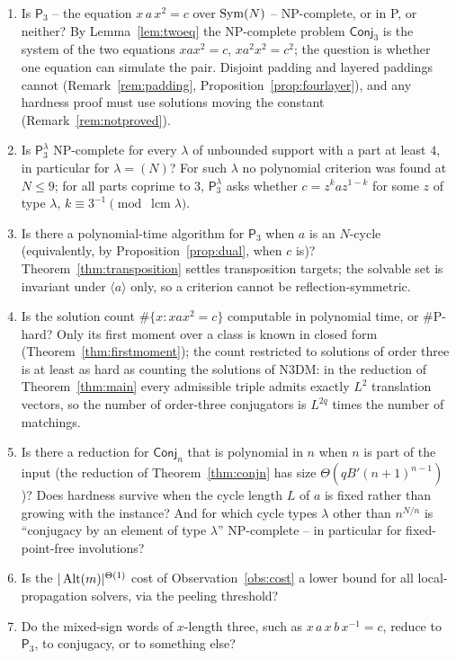 \documentclass[preprint,12pt]{elsarticle}
\theoremstyle{definition}\newtheorem{defi}[thm]{Definition}\newtheorem{prob}[thm]{Problem}\newtheorem{obs}[thm]{Observation}
\theoremstyle{remark}\newtheorem{rem}[thm]{Remark}
\newcommand{\Pthree}{\mathsf{P}_3}\newcommand{\Conj}[1]{\mathsf{Conj}_{#1}}\newcommand{\Dzero}{\Conj{3}}\newcommand{\TR}{T_{\mathcal R}}
\begin{document}
\begin{enumerate}
\item Is $\Pthree$ -- the equation $x\,a\,x^{2}=c$ over $\operatorname{Sym}(N)$ -- NP-complete, or in P, or neither? By Lemma~\ref{lem:twoeq} the NP-complete problem $\Dzero$ is the system of the two equations $xax^{2}=c$, $xa^{2}x^{2}=c^{2}$; the question is whether one equation can simulate the pair. Disjoint padding and layered paddings cannot (Remark~\ref{rem:padding}, Proposition~\ref{prop:fourlayer}), and any hardness proof must use solutions moving the constant (Remark~\ref{rem:notproved}).
\item Is $\Pthree^{\lambda}$ NP-complete for every $\lambda$ of unbounded support with a part at least $4$, in particular for $\lambda=(N)$? For such $\lambda$ no polynomial criterion was found at $N\le9$; for all parts coprime to $3$, $\Pthree^{\lambda}$ asks whether $c=z^{k}az^{1-k}$ for some $z$ of type $\lambda$, $k\equiv3^{-1}\pmod{\operatorname{lcm}\lambda}$.
\item Is there a polynomial-time algorithm for $\Pthree$ when $a$ is an $N$-cycle (equivalently, by Proposition~\ref{prop:dual}, when $c$ is)? Theorem~\ref{thm:transposition} settles transposition targets; the solvable set is invariant under $\langle a\rangle$ only, so a criterion cannot be reflection-symmetric.
\item Is the solution count $\#\{x:xax^{2}=c\}$ computable in polynomial time, or $\#\mathrm P$-hard? Only its first moment over a class is known in closed form (Theorem~\ref{thm:firstmoment}); the count restricted to solutions of order three is at least as hard as counting the solutions of N3DM: in the reduction of
Theorem~\ref{thm:main} every admissible triple admits exactly $L^{2}$ translation vectors, so the number of order-three conjugators is
$L^{2q}$ times the number of matchings.
\item Is there a reduction for $\Conj{n}$ that is polynomial in $n$ when $n$ is part of the input (the reduction of Theorem~\ref{thm:conjn} has size $\Theta(qB'(n+1)^{n-1})$)? Does hardness survive when the cycle length $L$ of $a$ is fixed rather than growing with the instance? And for which cycle types $\lambda$ other than $n^{N/n}$ is ``conjugacy by an element of type $\lambda$'' NP-complete -- in particular for fixed-point-free involutions?
\item Is the $|\operatorname{Alt}(m)|^{\Theta(1)}$ cost of Observation~\ref{obs:cost} a lower bound for all local-propagation solvers, via the peeling threshold?
\item Do the mixed-sign words of $x$-length three, such as $x\,a\,x\,b\,x^{-1}=c$, reduce to $\Pthree$, to conjugacy, or to something else?
\end{enumerate}
\end{document}
